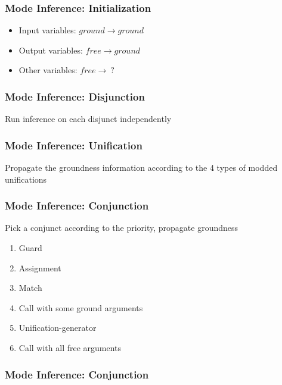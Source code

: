 \documentclass[xcolor=table]{beamer}
\begin{document}
\begin{frame}[fragile]
  \frametitle{Mode Inference: Initialization }

\begin{itemize}
  \item Input variables: $ground \rightarrow ground $
  \item Output variables: $free \rightarrow ground$
  \item Other variables: $free \rightarrow \ ? $
\end{itemize}

\vfill


\end{frame}

\begin{frame}[fragile]
  \frametitle{Mode Inference: Disjunction }
Run inference on each disjunct independently

\vfill



\end{frame}


\begin{frame}[fragile]
  \frametitle{Mode Inference: Unification}
Propagate the groundness information according to the 4 types of modded unifications

\vfill



\end{frame}

\begin{frame}[fragile]
  \frametitle{Mode Inference: Conjunction}
Pick a conjunct according to the priority, propagate groundness

\vfill

\begin{enumerate}
  \item Guard
  \item Assignment
  \item Match
  \item Call with some ground arguments
  \item Unification-generator
  \item Call with all free arguments
\end{enumerate}
\end{frame}

\begin{frame}[fragile]
  \frametitle{Mode Inference: Conjunction}
 \pause
 \pause

\end{frame}
\end{document}
